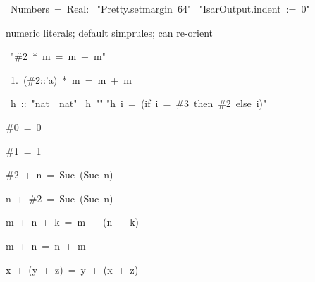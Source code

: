 %
\begin{isabelle}
\def\isabellecontext{Numbers}
\isanewline
{}\ Numbers\ =\ Real:\isanewline
\isanewline
{}\ "Pretty.setmargin\ 64"\isanewline
{}\ "IsarOutput.indent\ :=\ 0"
\begin{isamarkuptext}
numeric literals; default simprules; can re-orient%
\end{isamarkuptext}
\ "\#2\ *\ m\ =\ m\ +\ m"
\begin{isamarkuptxt}
\begin{isabelle}
\ 1.\ (\#2::'a)\ *\ m\ =\ m\ +\ m%
\end{isabelle}
\end{isamarkuptxt}
\isanewline
\isanewline
{}\ h\ ::\ "nat\ \isasymRightarrow \ nat"\isanewline
{}\ h\ "\isacharbraceleft \isacharbraceright "\isanewline
"h\ i\ =\ (if\ i\ =\ \#3\ then\ \#2\ else\ i)"
\begin{isamarkuptext}
\end{isamarkuptext}
%
\begin{isamarkuptext}
\begin{isabelle}
\#0\ =\ 0
\end{isabelle}

\begin{isabelle}
\#1\ =\ 1
\end{isabelle}

\begin{isabelle}
\#2\ +\ n\ =\ Suc\ (Suc\ n)
\end{isabelle}

\begin{isabelle}
n\ +\ \#2\ =\ Suc\ (Suc\ n)
\end{isabelle}

\begin{isabelle}
m\ +\ n\ +\ k\ =\ m\ +\ (n\ +\ k)
\end{isabelle}

\begin{isabelle}
m\ +\ n\ =\ n\ +\ m%
\end{isabelle}

\begin{isabelle}
x\ +\ (y\ +\ z)\ =\ y\ +\ (x\ +\ z)
\end{isabelle}


\end{isamarkuptext}
\end{isabelle}
